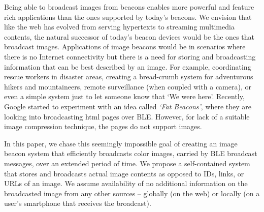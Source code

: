 Being able to broadcast images from beacons enables more powerful and feature rich applications than the ones supported by today's beacons. We envision that like the web has evolved from serving hypertexts to streaming multimedia contents, the natural successor of today's beacon devices would be the ones that broadcast images. Applications of image beacons would be in scenarios where there is no Internet connectivity but there is a need for storing and broadcasting information that can be best described by an image. For example, coordinating rescue workers in disaster areas, creating a bread-crumb system for adventurous hikers and mountaineers, remote surveillance (when coupled with a camera), or even a simple system just to let someone know that `We were here'.  Recently, Google started to experiment with an idea called \textit{`Fat Beacons'}, where they are looking into broadcasting html pages over BLE. However, for lack of a suitable image compression technique, the pages do not support images.



In this paper, we chase this seemingly impossible goal of creating an image beacon system that efficiently broadcasts color images, carried by BLE broadcast messages, over an extended period of time. We propose a self-contained system that stores and broadcasts actual image contents as opposed to IDs, links, or URLs of an image. We assume availability of no additional information on the broadcasted image from any other sources -- globally (on the web) or locally (on a user's smartphone that receives the broadcast).

